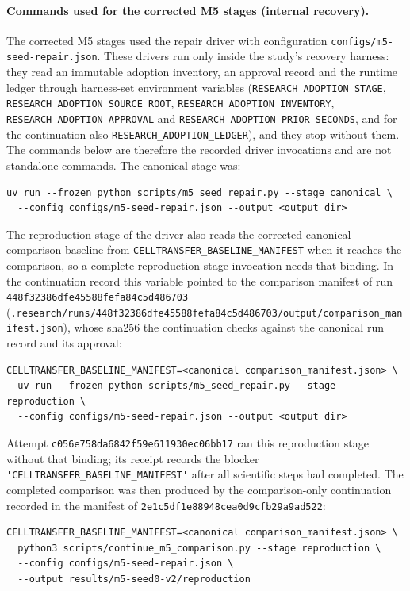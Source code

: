 \documentclass[11pt]{article}
\newcommand{\runid}{\nolinkurl{448f32386dfe45588fefa84c5d486703}}
\newcommand{\cfailid}{\nolinkurl{c056e758da6842f59e611930ec06bb17}}
\newcommand{\ccontid}{\nolinkurl{2e1c5df1e88948cea0d9cfb29a9ad522}}
\begin{document}
\paragraph{Commands used for the corrected M5 stages (internal recovery).} The corrected M5 stages used the repair driver with configuration \nolinkurl{configs/m5-seed-repair.json}. These drivers run only inside the study's recovery harness: they read an immutable adoption inventory, an approval record and the runtime ledger through harness-set environment variables (\nolinkurl{RESEARCH_ADOPTION_STAGE}, \nolinkurl{RESEARCH_ADOPTION_SOURCE_ROOT}, \nolinkurl{RESEARCH_ADOPTION_INVENTORY}, \nolinkurl{RESEARCH_ADOPTION_APPROVAL} and \nolinkurl{RESEARCH_ADOPTION_PRIOR_SECONDS}, and for the continuation also \nolinkurl{RESEARCH_ADOPTION_LEDGER}), and they stop without them. The commands below are therefore the recorded driver invocations and are not standalone commands. The canonical stage was:
\begin{verbatim}
uv run --frozen python scripts/m5_seed_repair.py --stage canonical \
  --config configs/m5-seed-repair.json --output <output dir>
\end{verbatim}
The reproduction stage of the driver also reads the corrected canonical comparison baseline from \verb|CELLTRANSFER_BASELINE_MANIFEST| when it reaches the comparison, so a complete reproduction-stage invocation needs that binding. In the continuation record this variable pointed to the comparison manifest of run \runid{} (\nolinkurl{.research/runs/448f32386dfe45588fefa84c5d486703/output/comparison_manifest.json}), whose sha256 the continuation checks against the canonical run record and its approval:
\begin{verbatim}
CELLTRANSFER_BASELINE_MANIFEST=<canonical comparison_manifest.json> \
  uv run --frozen python scripts/m5_seed_repair.py --stage reproduction \
  --config configs/m5-seed-repair.json --output <output dir>
\end{verbatim}
Attempt \cfailid{} ran this reproduction stage without that binding; its receipt records the blocker \verb|'CELLTRANSFER_BASELINE_MANIFEST'| after all scientific steps had completed. The completed comparison was then produced by the comparison-only continuation recorded in the manifest of \ccontid:
\begin{verbatim}
CELLTRANSFER_BASELINE_MANIFEST=<canonical comparison_manifest.json> \
  python3 scripts/continue_m5_comparison.py --stage reproduction \
  --config configs/m5-seed-repair.json \
  --output results/m5-seed0-v2/reproduction
\end{verbatim}
\end{document}
